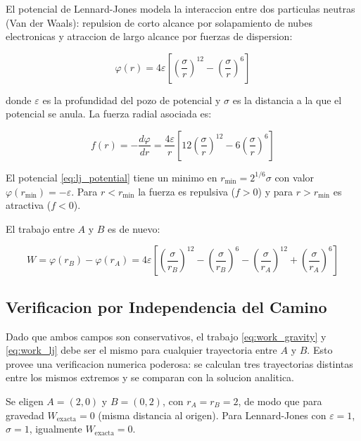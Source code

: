 \documentclass[12pt,a4paper]{article}
\begin{document}
El potencial de Lennard-Jones modela la interaccion entre dos particulas
neutras (Van der Waals): repulsion de corto alcance por solapamiento de
nubes electronicas y atraccion de largo alcance por fuerzas de dispersion:

\begin{equation}
    \varphi(r) = 4\varepsilon\left[
        \left(\frac{\sigma}{r}\right)^{12}
      - \left(\frac{\sigma}{r}\right)^{6}
    \right]
    \label{eq:lj_potential}
\end{equation}

donde $\varepsilon$ es la profundidad del pozo de potencial y $\sigma$ es
la distancia a la que el potencial se anula. La fuerza radial asociada es:

\begin{equation}
    f(r) = -\frac{d\varphi}{dr}
    = \frac{4\varepsilon}{r}\left[
        12\left(\frac{\sigma}{r}\right)^{12}
      - 6\left(\frac{\sigma}{r}\right)^{6}
    \right]
    \label{eq:lj_force}
\end{equation}

El potencial \eqref{eq:lj_potential} tiene un minimo en
$r_{\min} = 2^{1/6}\sigma$ con valor $\varphi(r_{\min}) = -\varepsilon$.
Para $r < r_{\min}$ la fuerza es repulsiva ($f > 0$) y para $r > r_{\min}$
es atractiva ($f < 0$).

El trabajo entre $A$ y $B$ es de nuevo:

\begin{equation}
\boxed{
    W = \varphi(r_B) - \varphi(r_A)
    = 4\varepsilon\left[
        \left(\frac{\sigma}{r_B}\right)^{12}
      - \left(\frac{\sigma}{r_B}\right)^{6}
      - \left(\frac{\sigma}{r_A}\right)^{12}
      + \left(\frac{\sigma}{r_A}\right)^{6}
    \right]
}
\label{eq:work_lj}
\end{equation}

\subsection{Verificacion por Independencia del Camino}

Dado que ambos campos son conservativos, el trabajo \eqref{eq:work_gravity}
y \eqref{eq:work_lj} debe ser el mismo para cualquier trayectoria entre
$A$ y $B$. Esto provee una verificacion numerica poderosa: se calculan
tres trayectorias distintas entre los mismos extremos y se comparan
con la solucion analitica.

Se eligen $A = (2, 0)$ y $B = (0, 2)$, con $r_A = r_B = 2$, de modo que
para gravedad $W_{\text{exacta}} = 0$ (misma distancia al origen). Para
Lennard-Jones con $\varepsilon = 1$, $\sigma = 1$, igualmente
$W_{\text{exacta}} = 0$.
\end{document}
